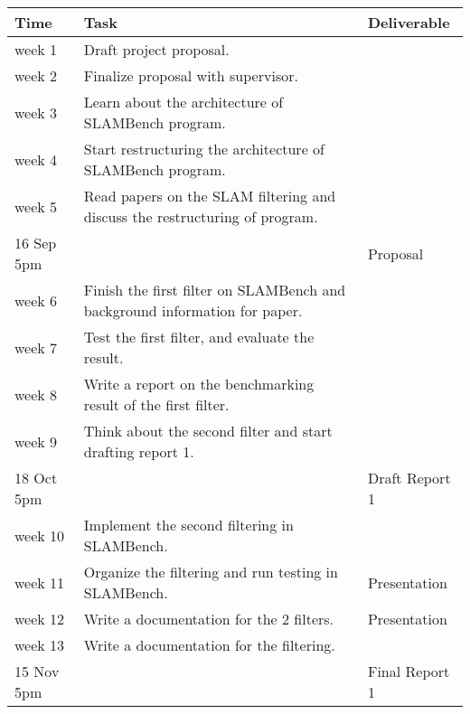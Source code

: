 \documentclass[11pt, oneside, a4paper]{article}
\begin{document}
\begin{center}
    \begin{tabular}{|l|l|l|} 
        \hline
        Time & Task & Deliverable\\
        \hline
        week 1 & Draft project proposal. & \\ 
        \hline
        week 2 & Finalize proposal with supervisor.& \\ 
        \hline
        week 3 & Learn about the architecture of SLAMBench program.&\\
        \hline
        week 4 & Start restructuring the architecture of SLAMBench program.&\\
        \hline
        week 5 & Read papers on the SLAM filtering and discuss the restructuring of program.&\\
        \hline 
        16 Sep 5pm & & Proposal\\
        \hline
        week 6 & Finish the first filter on SLAMBench and background information for paper.&\\
        \hline
        week 7 & Test the first filter, and evaluate the result.&\\
        \hline
        week 8 & Write a report on the benchmarking result of the first filter.&\\
        \hline
        week 9 & Think about the second filter and start drafting report 1.&\\
        \hline
        18 Oct 5pm & & Draft Report 1\\
        \hline
        week 10 & Implement the second filtering in SLAMBench.&\\
        \hline
        week 11 & Organize the filtering and run testing in SLAMBench.& Presentation\\
        \hline
        week 12 & Write a documentation for the 2 filters.& Presentation\\
        \hline
        week 13 & Write a documentation for the filtering.&\\
        \hline
        15 Nov 5pm & & Final Report 1\\
        \hline
    \end{tabular}
\end{center}
\end{document}
